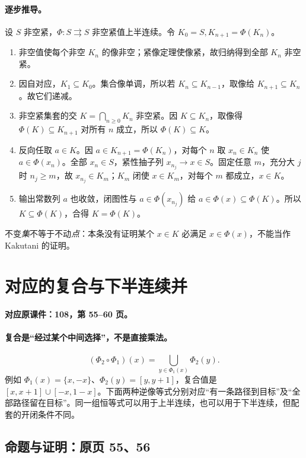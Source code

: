 \documentclass[11pt,a4paper]{article}
\theoremstyle{definition}\newtheorem{definition}{定义}\newtheorem{example}{例}
\begin{document}
\paragraph{逐步推导。}
设 $S$ 非空紧，$\Phi:S\rightrightarrows S$ 非空紧值上半连续。令 $K_0=S,K_{n+1}=\Phi(K_n)$。
\begin{enumerate}
\item 非空值使每个非空 $K_n$ 的像非空；紧像定理使像紧，故归纳得到全部 $K_n$ 非空紧。
\item 因自对应，$K_1\subseteq K_0$。集合像单调，所以若 $K_n\subseteq K_{n-1}$，取像给 $K_{n+1}\subseteq K_n$。故它们递减。
\item 非空紧集套的交 $K=\bigcap_{n\ge0}K_n$ 非空紧。因 $K\subseteq K_n$，取像得 $\Phi(K)\subseteq K_{n+1}$ 对所有 $n$ 成立，所以 $\Phi(K)\subseteq K$。
\item 反向任取 $a\in K$。因 $a\in K_{n+1}=\Phi(K_n)$，对每个 $n$ 取 $x_n\in K_n$ 使 $a\in\Phi(x_n)$。全部 $x_n\in S$，紧性抽子列 $x_{n_j}\to x\in S$。固定任意 $m$，充分大 $j$ 时 $n_j\ge m$，故 $x_{n_j}\in K_m$；$K_m$ 闭使 $x\in K_m$，对每个 $m$ 都成立，$x\in K$。
\item 输出常数列 $a$ 也收敛，闭图性与 $a\in\Phi(x_{n_j})$ 给 $a\in\Phi(x)\subseteq\Phi(K)$。所以 $K\subseteq\Phi(K)$，合得 $K=\Phi(K)$。
\end{enumerate}
不变\emph{集}不等于不动\emph{点}：本条没有证明某个 $x\in K$ 必满足 $x\in\Phi(x)$，不能当作 Kakutani 的证明。


\clearpage\section{对应的复合与下半连续并}\label{g:108:55}

\textbf{对应原课件：108，第 55--60 页。}


\paragraph{复合是“经过某个中间选择”，不是直接乘法。}
\[(\Phi_2\circ\Phi_1)(x)=\bigcup_{y\in\Phi_1(x)}\Phi_2(y).
\]
例如 $\Phi_1(x)=\{x,-x\}$、$\Phi_2(y)=[y,y+1]$，复合值是 $[x,x+1]\cup[-x,1-x]$。下面两种逆像等式分别对应“有一条路径到目标”及“全部路径留在目标”。同一组恒等式可以用于上半连续，也可以用于下半连续，但配套的开闭条件不同。


\subsection{命题与证明：原页 55、56}
\end{document}
